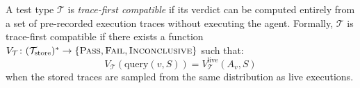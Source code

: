 \begin{definition}
\label{def:trace-first}
A test type $\mathcal{T}$ is \emph{trace-first compatible} if its
verdict can be computed entirely from a set of pre-recorded execution
traces without executing the agent. Formally, $\mathcal{T}$ is
trace-first compatible if there exists a function
$V_{\mathcal{T}}\colon (\mathcal{T}_{\mathrm{store}})^* \to
\{\textsc{Pass}{},\allowbreak \textsc{Fail}{},\allowbreak \textsc{Inconclusive}{}\}$ such that:
\begin{equation}
\label{eq:trace-first}
  V_{\mathcal{T}}(\mathrm{query}(v, S)) =
  V_{\mathcal{T}}^{\mathrm{live}}(A_v, S)
\end{equation}
when the stored traces are sampled from the same distribution as live
executions.
\end{definition}

